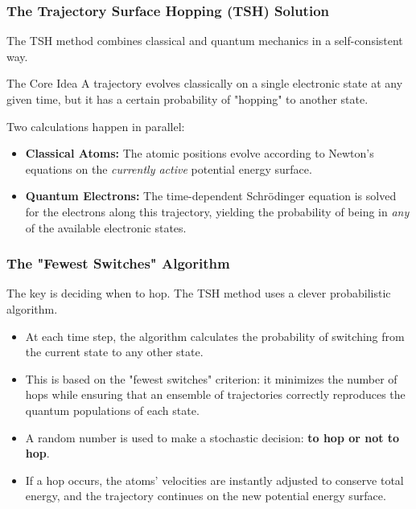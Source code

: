 \begin{frame}
  \frametitle{The Trajectory Surface Hopping (TSH) Solution}
  
  The TSH method combines classical and quantum mechanics in a self-consistent way. \pause
  
  \begin{block}{The Core Idea}
    A trajectory evolves classically on a single electronic state at any given time, but it has a certain probability of "hopping" to another state.
  \end{block} \pause
  
  Two calculations happen in parallel:
  
  \begin{itemize}
    \item \textbf{Classical Atoms:} The atomic positions evolve according to Newton's equations on the \textit{currently active} potential energy surface. \pause
    
    \item \textbf{Quantum Electrons:} The time-dependent Schrödinger equation is solved for the electrons along this trajectory, yielding the probability of being in \textit{any} of the available electronic states.
  \end{itemize}
\end{frame}

\begin{frame}
  \frametitle{The "Fewest Switches" Algorithm}
  
  The key is deciding when to hop. The TSH method uses a clever probabilistic algorithm. \pause
  
  \begin{itemize}
    \item At each time step, the algorithm calculates the probability of switching from the current state to any other state. \pause
    
    \item This is based on the "fewest switches" criterion: it minimizes the number of hops while ensuring that an ensemble of trajectories correctly reproduces the quantum populations of each state. \pause
    
    \item A random number is used to make a stochastic decision: \textbf{to hop or not to hop}. \pause
    
    \item If a hop occurs, the atoms' velocities are instantly adjusted to conserve total energy, and the trajectory continues on the new potential energy surface.
  \end{itemize}
\end{frame}